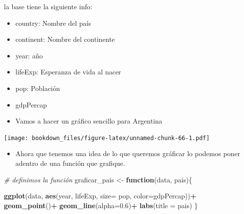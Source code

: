 \documentclass[]{book}
\newenvironment{Shaded}{\begin{snugshade}}{\end{snugshade}}
\newcommand{\CommentTok}[1]{\textcolor[rgb]{0.56,0.35,0.01}{\textit{#1}}}
\newcommand{\ControlFlowTok}[1]{\textcolor[rgb]{0.13,0.29,0.53}{\textbf{#1}}}
\newcommand{\DataTypeTok}[1]{\textcolor[rgb]{0.13,0.29,0.53}{#1}}
\newcommand{\FloatTok}[1]{\textcolor[rgb]{0.00,0.00,0.81}{#1}}
\newcommand{\KeywordTok}[1]{\textcolor[rgb]{0.13,0.29,0.53}{\textbf{#1}}}
\newcommand{\NormalTok}[1]{#1}
\newcommand{\OperatorTok}[1]{\textcolor[rgb]{0.81,0.36,0.00}{\textbf{#1}}}
\newcommand{\StringTok}[1]{\textcolor[rgb]{0.31,0.60,0.02}{#1}}
\providecommand{\tightlist}{%
  \setlength{\itemsep}{0pt}\setlength{\parskip}{0pt}}
\begin{document}
la base tiene la siguiente info:

\begin{itemize}
\item
  country: Nombre del país
\item
  continent: Nombre del continente
\item
  year: año
\item
  lifeExp: Esperanza de vida al nacer
\item
  pop: Población
\item
  gdpPercap
\item
  Vamos a hacer un gráfico sencillo para Argentina
\end{itemize}

\begin{Shaded}
\end{Shaded}

\texttt{[image: bookdown\_files/figure-latex/unnamed-chunk-66-1.pdf]}

\begin{itemize}
\tightlist
\item
  Ahora que tenemos una idea de lo que queremos gráficar lo podemos poner adentro de una función que grafique.
\end{itemize}

\begin{Shaded}
\begin{Highlighting}[]
\CommentTok{# definimos la función}
\NormalTok{graficar_pais <-}\StringTok{ }\ControlFlowTok{function}\NormalTok{(data, pais)\{}
  
  \KeywordTok{ggplot}\NormalTok{(data, }\KeywordTok{aes}\NormalTok{(year, lifeExp, }\DataTypeTok{size=}\NormalTok{ pop, }\DataTypeTok{color=}\NormalTok{gdpPercap))}\OperatorTok{+}
\StringTok{    }\KeywordTok{geom_point}\NormalTok{()}\OperatorTok{+}
\StringTok{    }\KeywordTok{geom_line}\NormalTok{(}\DataTypeTok{alpha=}\FloatTok{0.6}\NormalTok{)}\OperatorTok{+}
\StringTok{    }\KeywordTok{labs}\NormalTok{(}\DataTypeTok{title =}\NormalTok{ pais)}
\NormalTok{\}}
\end{Highlighting}
\end{Shaded}
\end{document}
